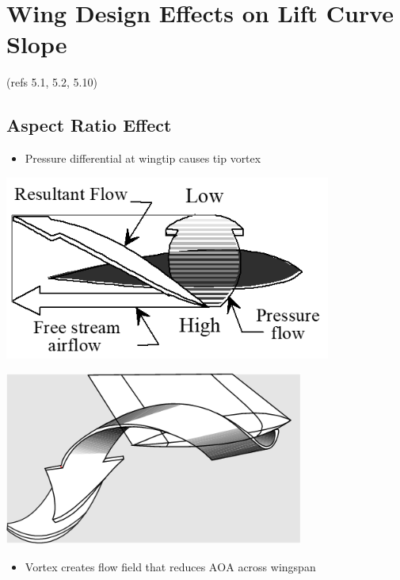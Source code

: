 \documentclass[
]{book}
\providecommand{\tightlist}{%
  \setlength{\itemsep}{0pt}\setlength{\parskip}{0pt}}
\begin{document}
\hypertarget{wing-design-effects-on-lift-curve-slope}{%
\section{Wing Design Effects on Lift Curve Slope}\label{wing-design-effects-on-lift-curve-slope}}

(refs 5.1, 5.2, 5.10)

\hypertarget{aspect-ratio-effect}{%
\subsection*{Aspect Ratio Effect}\label{aspect-ratio-effect}}

\begin{itemize}
\tightlist
\item
  Pressure differential at wingtip causes tip vortex
\end{itemize}

\includegraphics[width=4.231in,height=2.375in]{media/05/image13.png}

\includegraphics[width=3.875in,height=2.249in]{media/05/image14.png}

\begin{itemize}
\tightlist
\item
  Vortex creates flow field that reduces \(\mathrm{AOA}\) across wingspan
\end{itemize}
\end{document}
